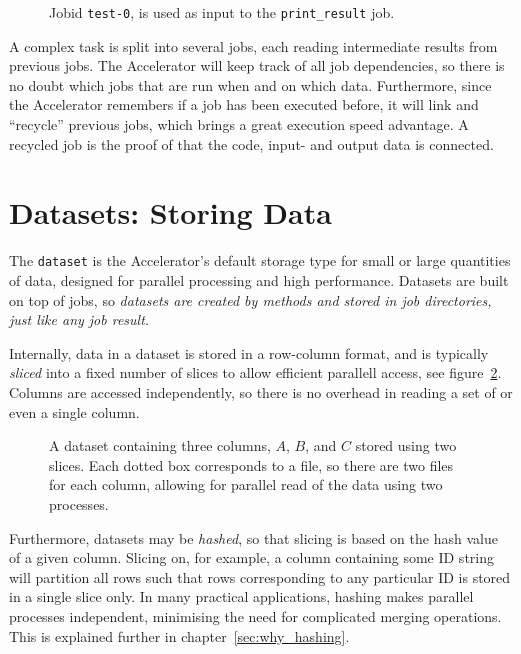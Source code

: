 \begin{figure}[h!]
  \begin{center}
    
    \caption{Jobid \texttt{test-0}, is used as input to the
      \texttt{print\_result} job.}
    \label{fig:execflow-print-result}
  \end{center}
\end{figure}

A complex task is split into several jobs, each reading intermediate
results from previous jobs.  The Accelerator will keep track of all
job dependencies, so there is no doubt which jobs that are run when
and on which data.  Furthermore, since the Accelerator remembers if a
job has been executed before, it will link and ``recycle'' previous
jobs, which brings a great execution speed advantage.  A recycled job
is the proof of that the code, input- and output data is connected.


\section{Datasets: Storing Data}

The \texttt{dataset} is the Accelerator's default storage type for
small or large quantities of data, designed for parallel processing
and high performance.  Datasets are built on top of jobs, so
\emph{datasets are created by methods and stored in job directories,
  just like any job result.}

Internally, data in a dataset is stored in a row-column format, and is
typically \emph{sliced} into a fixed number of slices to allow
efficient parallell access, see figure~\ref{fig:dataset}. Columns are
accessed independently, so there is no overhead in reading a set of or
even a single column.


\begin{figure}[h!]
  \begin{center}
    
    \caption{A dataset containing three columns, $A$, $B$, and $C$
      stored using two slices.  Each dotted box corresponds to a file,
      so there are two files for each column, allowing for parallel
      read of the data using two processes.}
    \label{fig:dataset}
  \end{center}
\end{figure}

Furthermore, datasets may be \textsl{hashed}, so that slicing is based
on the hash value of a given column.  Slicing on, for example, a
column containing some ID string will partition all rows such that
rows corresponding to any particular ID is stored in a single slice
only.  In many practical applications, hashing makes parallel
processes independent, minimising the need for complicated merging
operations.  This is explained further in chapter~\ref{sec:why_hashing}.



